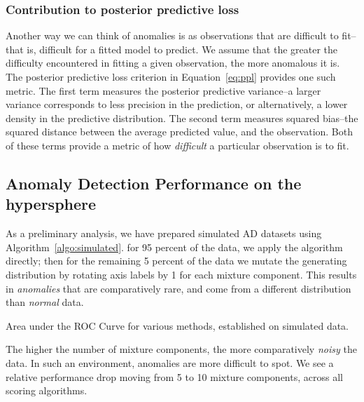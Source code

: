 \subsubsection{Contribution to posterior predictive loss}
Another way we can think of anomalies is as observations that are difficult to fit--that is, difficult
  for a fitted model to predict.  We assume that the greater the difficulty encountered in fitting a
  given observation, the more anomalous it is.  The posterior predictive loss criterion in
  Equation~\ref{eq:ppl} provides one such metric.  The first term measures the posterior predictive
  variance--a larger variance corresponds to less precision in the prediction, or alternatively, a lower
  density in the predictive distribution.  The second term measures squared bias--the squared distance
  between the average predicted value, and the observation.  Both of these terms provide a metric of
  how \emph{difficult} a particular observation is to fit.

\subsection{Anomaly Detection Performance on the hypersphere}
As a preliminary analysis, we have prepared simulated AD datasets using Algorithm~\ref{algo:simulated}.
  for 95 percent of the data, we apply the algorithm directly; then for the remaining 5 percent of the
  data we mutate the generating distribution by rotating axis labels by 1 for each mixture component.
  This results in \emph{anomalies} that are comparatively rare, and come from a different distribution
  than \emph{normal} data.

\begin{table}[h]
  \centering
  \label{tab:ad_sim_results}
  
  \caption{Area under the ROC Curve for various methods, established on simulated data.}
\end{table}

The higher the number of mixture components, the more comparatively \emph{noisy} the data.  In such
  an environment, anomalies are more difficult to spot.  We see a relative performance drop moving
  from 5 to 10 mixture components, across all scoring algorithms.





